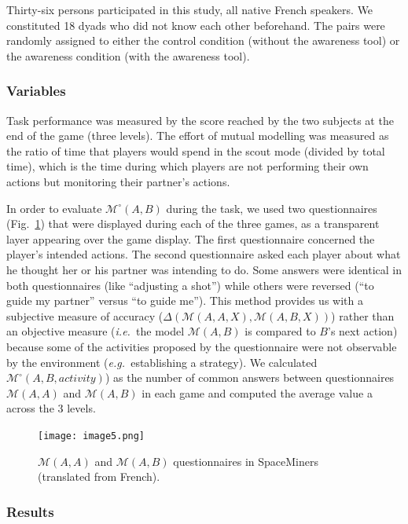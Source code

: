 \documentclass[natbib]{svjour3}
\newcommand{\ie}{{\textit{i.e.\ }}}
\newcommand{\eg}{{\textit{e.g.\ }}}
\newcommand{\M}[3]{{\mathcal{M}(#1, #2, #3)}}
\newcommand{\gmodel}[2]{{$\mathcal{M}(#1, #2)$}}
\newcommand{\Model}[3]{{$\mathcal{M}^{\circ}(#1, #2, #3)$}}
\newcommand{\gModel}[2]{{$\mathcal{M}^{\circ}(#1, #2)$}}
\begin{document}
Thirty-six persons participated in this study, all native French speakers. We
constituted 18 dyads who did not know each other beforehand. The pairs were
randomly assigned to either the control condition (without the awareness tool)
or the awareness condition (with the awareness tool).

\subsubsection*{Variables}

Task performance was measured by the score reached by the two subjects at the
end of the game (three levels). The effort of mutual modelling was measured as
the ratio of time that players would spend in the scout mode (divided by total
time), which is the time during which players are not performing their own
actions but monitoring their partner's actions.

In order to evaluate \gModel{A}{B} during the task, we used two questionnaires
(Fig.~\ref{study1:questionnaires}) that were displayed during each of the three
games, as a transparent layer appearing over the game display. The first
questionnaire concerned the player's intended actions. The second questionnaire
asked each player about what he thought her or his partner was intending to do.
Some answers were identical in both questionnaires (like ``adjusting a shot'')
while others were reversed (``to guide my partner'' versus ``to guide me'').
This method provides us with a subjective measure of accuracy
($\Delta(\M{A}{A}{X}, \M{A}{B}{X})$) rather than an objective measure (\ie the
model \gmodel{A}{B} is compared to $B$'s next action) because some of the
activities proposed by the questionnaire were not observable by the environment
(\eg establishing a strategy). We calculated \Model{A}{B}{activity})
as the number of common answers between questionnaires \gmodel{A}{A} and
\gmodel{A}{B} in each game and computed the average value a across the 3 levels.

\begin{figure}[ht!]
        \centering
        \texttt{[image: image5.png]}
        \caption{\gmodel{A}{A} and \gmodel{A}{B} questionnaires in SpaceMiners
        (translated from French).}

        \label{study1:questionnaires}
\end{figure}

\subsubsection*{Results}
\end{document}
